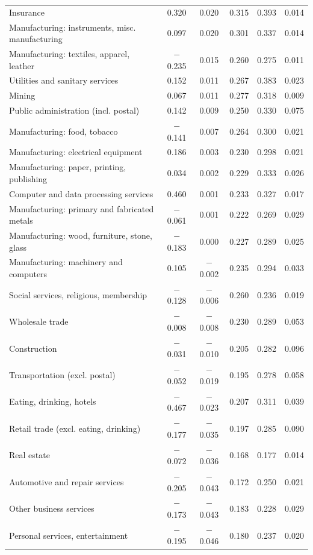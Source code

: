 \begin{table}[!htbp]
{{\begin{tabular}{lccccc}
Insurance & 0.320 & 0.020 & 0.315 & 0.393 & 0.014 \\
Manufacturing: instruments, misc. manufacturing & 0.097 & 0.020 & 0.301 & 0.337 & 0.014 \\
Manufacturing: textiles, apparel, leather & $-$0.235 & 0.015 & 0.260 & 0.275 & 0.011 \\
Utilities and sanitary services & 0.152 & 0.011 & 0.267 & 0.383 & 0.023 \\
Mining & 0.067 & 0.011 & 0.277 & 0.318 & 0.009 \\
Public administration (incl. postal) & 0.142 & 0.009 & 0.250 & 0.330 & 0.075 \\
Manufacturing: food, tobacco & $-$0.141 & 0.007 & 0.264 & 0.300 & 0.021 \\
Manufacturing: electrical equipment & 0.186 & 0.003 & 0.230 & 0.298 & 0.021 \\
Manufacturing: paper, printing, publishing & 0.034 & 0.002 & 0.229 & 0.333 & 0.026 \\
Computer and data processing services & 0.460 & 0.001 & 0.233 & 0.327 & 0.017 \\
Manufacturing: primary and fabricated metals & $-$0.061 & 0.001 & 0.222 & 0.269 & 0.029 \\
Manufacturing: wood, furniture, stone, glass & $-$0.183 & 0.000 & 0.227 & 0.289 & 0.025 \\
Manufacturing: machinery and computers & 0.105 & $-$0.002 & 0.235 & 0.294 & 0.033 \\
Social services, religious, membership & $-$0.128 & $-$0.006 & 0.260 & 0.236 & 0.019 \\
Wholesale trade & $-$0.008 & $-$0.008 & 0.230 & 0.289 & 0.053 \\
Construction & $-$0.031 & $-$0.010 & 0.205 & 0.282 & 0.096 \\
Transportation (excl. postal) & $-$0.052 & $-$0.019 & 0.195 & 0.278 & 0.058 \\
Eating, drinking, hotels & $-$0.467 & $-$0.023 & 0.207 & 0.311 & 0.039 \\
Retail trade (excl. eating, drinking) & $-$0.177 & $-$0.035 & 0.197 & 0.285 & 0.090 \\
Real estate & $-$0.072 & $-$0.036 & 0.168 & 0.177 & 0.014 \\
Automotive and repair services & $-$0.205 & $-$0.043 & 0.172 & 0.250 & 0.021 \\
Other business services & $-$0.173 & $-$0.043 & 0.183 & 0.228 & 0.029 \\
Personal services, entertainment & $-$0.195 & $-$0.046 & 0.180 & 0.237 & 0.020 \\

\end{tabular}}}
\end{table}
